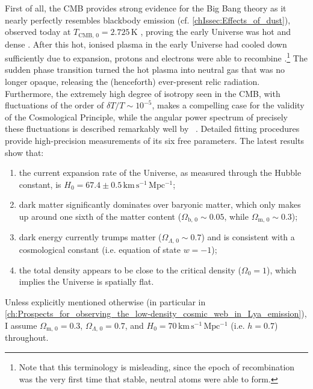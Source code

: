 First of all, the CMB provides strong evidence for the Big Bang theory as it nearly perfectly resembles blackbody emission (cf. \cref{chIssec:Effects_of_dust}), observed today at $T_{\text{CMB}, \, 0} = 2.725 \, \mathrm{K}$ \citep[e.g.][]{2009ApJ...707..916F}, proving the early Universe was hot and dense \citep[in fact, the existence of the CMB in a Big Bang model had been predicted before its discovery;][]{1949RvMP...21..367G}. After this hot, ionised plasma in the early Universe had cooled down sufficiently due to expansion, protons and electrons were able to recombine \citep[at a redshift of $z \sim \num{1100}$; e.g.][]{1985A&A...149..144J}.\footnote{Note that this terminology is misleading, since the epoch of recombination was the very first time that stable, neutral atoms were able to form.} The sudden phase transition turned the hot plasma into neutral gas that was no longer opaque, releasing the (henceforth) ever-present relic radiation. Furthermore, the extremely high degree of isotropy seen in the CMB, with fluctuations of the order of $\delta T / T \sim 10^{-5}$, makes a compelling case for the validity of the Cosmological Principle, while the angular power spectrum of precisely these fluctuations is described remarkably well by \LCDM\ \citep{2020A&A...641A...1P}. Detailed fitting procedures provide high-precision measurements of its six free parameters. The latest results \citep[e.g.][]{2020A&A...641A...6P} show that:
\begin{enumerate}[label=(\roman*)]
    \item the current expansion rate of the Universe, as measured through the Hubble constant, is $H_0 = 67.4 \pm 0.5 \, \mathrm{km \, s^{-1} \, Mpc^{-1}}$;
    \item dark matter significantly dominates over baryonic matter, which only makes up around one sixth of the matter content ($\Omega_{\text{b}, \, 0} \sim 0.05$, while $\Omega_{\text{m}, \, 0} \sim 0.3$);
    \item dark energy currently trumps matter ($\Omega_{\Lambda, \, 0} \sim 0.7$) and is consistent with a cosmological constant (i.e. equation of state $w = -1$);
    \item the total density appears to be close to the critical density ($\Omega_0 = 1$), which implies the Universe is spatially flat.
\end{enumerate}

Unless explicitly mentioned otherwise (in particular in \cref{ch:Prospects_for_observing_the_low-density_cosmic_web_in_Lya_emission}), I assume $\Omega_{\text{m}, \, 0} = 0.3$, $\Omega_{\Lambda, \, 0} = 0.7$, and $H_0 = 70 \, \mathrm{km \, s^{-1} \, Mpc^{-1}}$ (i.e. $h = 0.7$) throughout.

